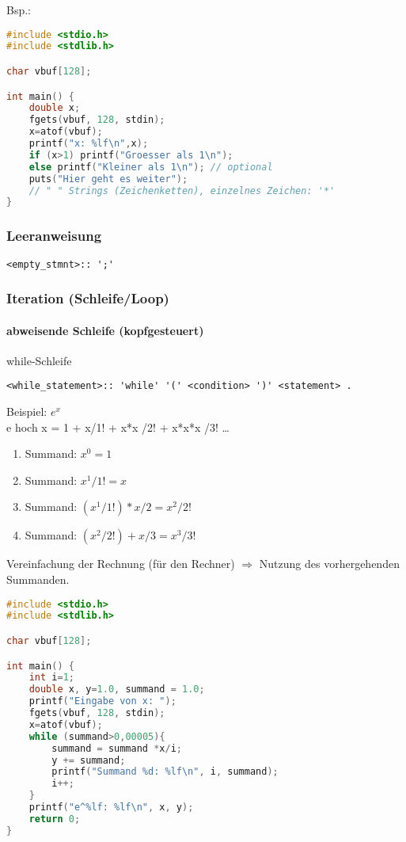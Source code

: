 Bsp.:
\begin{lstlisting}[language=C]
#include <stdio.h>
#include <stdlib.h>

char vbuf[128];

int main() {
	double x;
	fgets(vbuf, 128, stdin);
	x=atof(vbuf);
	printf("x: %lf\n",x);
	if (x>1) printf("Groesser als 1\n");
	else printf("Kleiner als 1\n");	// optional
	puts("Hier geht es weiter");	
	// " " Strings (Zeichenketten), einzelnes Zeichen: '*'
}
\end{lstlisting}

\subsubsection{Leeranweisung}
\begin{lstlisting}
<empty_stmnt>:: ';'
\end{lstlisting}

\subsubsection[Iteration]{Iteration (Schleife/Loop)}
\paragraph{abweisende Schleife (kopfgesteuert)} while-Schleife
\begin{lstlisting}
<while_statement>:: 'while' '(' <condition> ')' <statement> .
\end{lstlisting}

Beispiel: $e^x$\\
e hoch x = 1 + x/1! + x*x /2! + x*x*x /3! …
\begin{enumerate} [label= \arabic* .]
\item  Summand: $x^0=1$
\item  Summand: $x^1/1! = x$
\item  Summand: $(x^1/1!)*x/2 = x^2/2!$
\item  Summand: $(x^2/2!) + x/3 = x^3/3!$
\end{enumerate}
Vereinfachung der Rechnung (für den Rechner) $\Rightarrow$ Nutzung des vorhergehenden Summanden.
\begin{lstlisting}[language=C]
#include <stdio.h>
#include <stdlib.h>

char vbuf[128];

int main() {
	int i=1;
	double x, y=1.0, summand = 1.0;
	printf("Eingabe von x: ");
	fgets(vbuf, 128, stdin);
	x=atof(vbuf);
	while (summand>0,00005){
		summand = summand *x/i;
		y += summand;
		printf("Summand %d: %lf\n", i, summand);
		i++;
	}
	printf("e^%lf: %lf\n", x, y);
	return 0;
}
\end{lstlisting}

